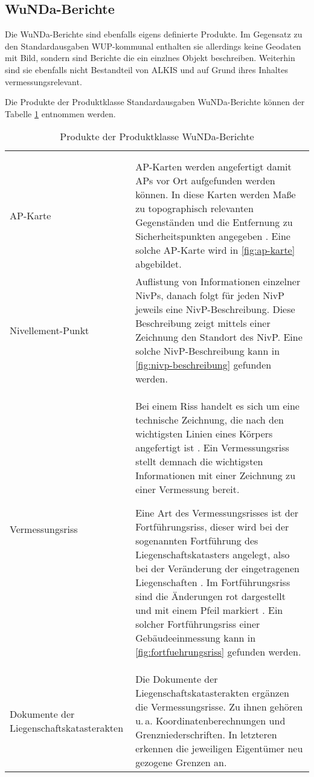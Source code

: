 \subsection{WuNDa-Berichte}
Die WuNDa-Berichte sind ebenfalls eigens definierte Produkte. Im Gegensatz zu den Standardausgaben WUP-kommunal enthalten sie allerdings keine Geodaten mit Bild, sondern sind Berichte die ein einzlnes Objekt beschreiben. Weiterhin sind sie ebenfalls nicht Bestandteil von ALKIS und auf Grund ihres Inhaltes vermessungsrelevant.

Die Produkte der Produktklasse Standardausgaben WuNDa-Berichte können der Tabelle \ref{tab-wunda-berichte} entnommen werden.
\begin{longtable}{|p{}|p{}|}	
	\caption{Produkte der Produktklasse WuNDa-Berichte} \label{tab-wunda-berichte} \\
	\hline 
		\rowcolor{gray}
	\head{Produktname}  & \head{Beschreibung} \tabularnewline
	\hline 
	\endfirsthead
	\caption{Produkte der Produktklasse WuNDa-Berichte} \\
	\hline 
		\rowcolor{gray}
	\head{Produktname}  & \head{Beschreibung} \tabularnewline
	\hline 
	\endhead
	AP-Karte
	&
	AP-Karten werden angefertigt damit \acfp{AP} vor Ort aufgefunden werden können. In diese Karten werden Maße zu topographisch relevanten Gegenständen und die Entfernung zu Sicherheitspunkten angegeben \autocite[vgl.][]{siegen-ap-karte}. Eine solche AP-Karte wird in \vref{fig:ap-karte} abgebildet.
	 \\
	\hline
	Nivellement-Punkt
	&
	Auflistung von Informationen einzelner \acfp{NivP}, danach folgt für jeden NivP jeweils eine NivP-Beschreibung. Diese Beschreibung zeigt mittels einer Zeichnung den Standort des NivP. Eine solche NivP-Beschreibung kann in \ref{fig:nivp-beschreibung} gefunden werden.  \\
	\hline
	Vermessungsriss
	&
	Bei einem Riss handelt es sich um eine technische Zeichnung, die nach den wichtigsten Linien eines Körpers angefertigt ist \autocite[vgl.][]{duden-riss}. Ein Vermessungsriss stellt demnach die wichtigsten Informationen mit einer Zeichnung zu einer Vermessung bereit.
	
	Eine Art des Vermessungsrisses ist der Fortführungsriss, dieser wird bei der sogenannten Fortführung des Liegenschaftskatasters angelegt, also bei der Veränderung der eingetragenen Liegenschaften \autocite[vgl.][]{vermpedia-fortfuehrung}.
	Im Fortführungsriss sind die Änderungen rot dargestellt und mit einem Pfeil markiert \autocite[vgl.][]{stelling-fortfuehrung}. Ein solcher Fortführungsriss einer Gebäudeeinmessung kann in \ref{fig:fortfuehrungsriss} gefunden werden.
	 \\
	\hline
	Dokumente der Liegenschaftskatasterakten
	&
	Die Dokumente der Liegenschaftskatasterakten ergänzen die Vermessungsrisse. Zu ihnen gehören u.\,a. Koordinatenberechnungen und Grenzniederschriften. In letzteren erkennen die jeweiligen Eigentümer neu gezogene Grenzen an.  \\
	\hline
\end{longtable} 
	
